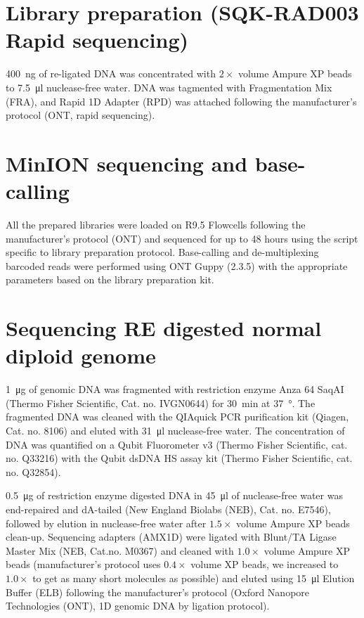 \section*{Library preparation (SQK-RAD003 Rapid sequencing)}
\SI{400}{\nano\gram} of re-ligated DNA was concentrated with \(2\times\)
volume Ampure XP beads to \SI{7.5}{\micro\litre} nuclease-free water.
DNA was tagmented with Fragmentation Mix (FRA), and Rapid 1D Adapter
(RPD) was attached following the manufacturer's protocol (ONT, rapid
sequencing).

\section*{MinION sequencing and base-calling}
All the prepared libraries were loaded on R9.5 Flowcells following the
manufacturer's protocol (ONT) and sequenced for up to 48 hours using the
script specific to library preparation protocol. Base-calling and
de-multiplexing barcoded reads were performed using ONT Guppy (2.3.5)
with the appropriate parameters based on the library preparation kit.

\section*{Sequencing RE digested normal diploid genome}
\SI{1}{\micro\gram} of genomic DNA was fragmented with restriction
enzyme Anza 64 SaqAI (Thermo Fisher Scientific, Cat. no. IVGN0644) for
\SI{30}{\minute} at \SI{37}{\degree}. The fragmented DNA was cleaned
with the QIAquick PCR purification kit (Qiagen, Cat. no. 8106) and
eluted with \SI{31}{\micro\litre} nuclease-free water. The concentration
of DNA was quantified on a Qubit Fluorometer v3 (Thermo Fisher
Scientific, cat. no. Q33216) with the Qubit dsDNA HS assay kit (Thermo
Fisher Scientific, cat. no. Q32854).

\SI{0.5}{\micro\gram} of restriction enzyme digested DNA in
\SI{45}{\micro\litre} of nuclease-free water was end-repaired and
dA-tailed (New England Biolabs (NEB), Cat. no. E7546), followed by
elution in nuclease-free water after \(1.5\times\) volume Ampure XP
beads clean-up. Sequencing adapters (AMX1D) were ligated with Blunt/TA
Ligase Master Mix (NEB, Cat.no. M0367) and cleaned with \(1.0\times\)
volume Ampure XP beads (manufacturer's protocol uses \(0.4\times\)
volume XP beads, we increased to \(1.0\times\) to get as many short
molecules as possible) and eluted using \SI{15}{\micro\litre} Elution
Buffer (ELB) following the manufacturer's protocol (Oxford Nanopore
Technologies (ONT), 1D genomic DNA by ligation protocol).

